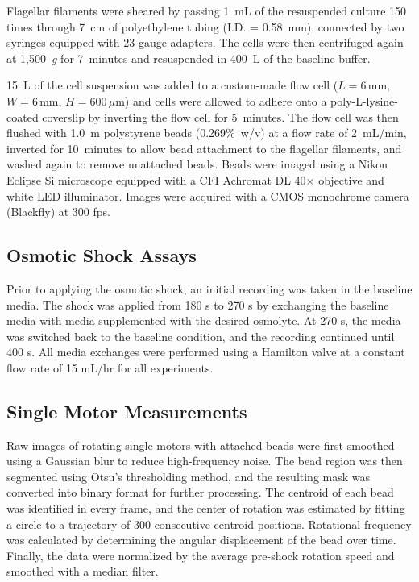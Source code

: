 \documentclass[twocolumn]{biophys-new}%
\begin{document}
Flagellar filaments were sheared by passing 1~mL of the resuspended culture 150 times through 7~cm of polyethylene tubing (I.D. = 0.58~mm), connected by two syringes equipped with 23-gauge adapters. The cells were then centrifuged again at 1,500~\textit{g} for 7~minutes and resuspended in 400~\textmu L of the baseline buffer.


15~\textmu L of the cell suspension was added to a custom-made flow cell ($L = 6\,\text{mm}$, $W = 6\,\text{mm}$, $H = 600\,\mu\text{m}$) and cells were allowed to adhere onto a poly-L-lysine-coated coverslip by inverting the flow cell for 5~minutes. The flow cell was then flushed with 1.0~\textmu m polystyrene beads (0.269\%~w/v) at a flow rate of 2~mL/min, inverted for 10~minutes to allow bead attachment to the flagellar filaments, and washed again to remove unattached beads. Beads were imaged using a Nikon Eclipse Si microscope equipped with a CFI Achromat DL 40$\times$ objective and white LED illuminator. Images were acquired with a CMOS monochrome camera (Blackfly) at 300 fps.

\subsection*{\textbf{Osmotic Shock Assays}}
Prior to applying the osmotic shock, an initial recording was taken in the baseline media. The shock was applied from 180 s to 270 s by exchanging the baseline media with media supplemented with the desired osmolyte. At 270 s, the media was switched back to the baseline condition, and the recording continued until 400 s. All media exchanges were performed using a Hamilton valve at a constant flow rate of 15 mL/hr for all experiments.

\subsection*{\textbf{Single Motor Measurements}}
Raw images of rotating single motors with attached beads were first smoothed using a Gaussian blur to reduce high-frequency noise. The bead region was then segmented using Otsu’s thresholding method, and the resulting mask was converted into binary format for further processing. The centroid of each bead was identified in every frame, and the center of rotation was estimated by fitting a circle to a trajectory of 300 consecutive centroid positions. Rotational frequency was calculated by determining the angular displacement of the bead over time. Finally, the data were normalized by the average pre-shock rotation speed and smoothed with a median filter.
\end{document}
